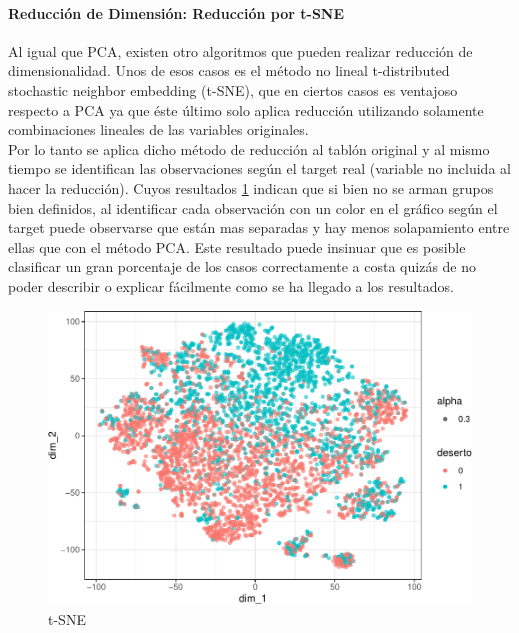 \paragraph{Reducción de Dimensión: Reducción por t-SNE}\label{reducciuxf3n-por-t-sne}

Al igual que PCA, existen otro algoritmos que pueden realizar reducción
de dimensionalidad. Unos de esos casos es el método no lineal
t-distributed stochastic neighbor embedding (t-SNE), que en ciertos
casos es ventajoso respecto a PCA ya que éste último solo aplica reducción utilizando solamente
combinaciones lineales de las variables originales.\\

Por lo tanto se aplica dicho método de reducción al tablón original y al mismo tiempo se identifican las observaciones según el target real (variable no incluida al hacer la reducción). Cuyos resultados \ref{fig:tsne} indican que si bien no se arman grupos bien definidos,
al identificar cada observación con un color en el gráfico según el
target puede observarse que están mas separadas y hay menos solapamiento entre ellas que con el método PCA. Este resultado puede insinuar que es posible clasificar un gran porcentaje de los casos correctamente a costa quizás de no poder describir o explicar fácilmente como se ha llegado a los resultados.


\begin{figure}[!htb]
	\centering
	\includegraphics{imagenes/reduccion_dimension/unnamed-chunk-11-1.pdf}
	\caption{t-SNE}
	\label{fig:tsne}
\end{figure}

\clearpage




